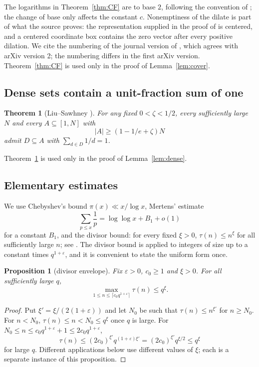 \documentclass[11pt,letterpaper]{article}
\numberwithin{equation}{section}
\theoremstyle{plain}
\newtheorem{theorem}{Theorem}
\newtheorem{proposition}{Proposition}
\theoremstyle{remark}
\begin{document}
The logarithms in Theorem~\ref{thm:CF} are to base $2$, following the convention of \cite{CFP}; the change of base only affects the constant $c$. Nonemptiness of the dilate is part of what the source proves: the representation supplied in the proof of \cite[Theorem 1.5, pp.~26--27]{CFP} is centered, and a centered coordinate box contains the zero vector after every positive dilation. We cite the numbering of the journal version of \cite{CFHMPSV}, which agrees with arXiv version 2; the numbering differs in the first arXiv version. Theorem~\ref{thm:CF} is used only in the proof of Lemma~\ref{lem:cover}.

\subsection{Dense sets contain a unit-fraction sum of one}\label{sec:LS}

\begin{theorem}[Liu--Sawhney {\cite[Theorem 1.3]{LS}}]\label{thm:LS}
For any fixed $0<\zeta<1/2$, every sufficiently large $N$ and every $A\subseteq[1,N]$ with
\[
|A|\ge(1-1/e+\zeta)N
\]
admit $D\subseteq A$ with $\sum_{d\in D}1/d=1$.
\end{theorem}

Theorem~\ref{thm:LS} is used only in the proof of Lemma~\ref{lem:dense}.

\subsection{Elementary estimates}\label{sec:elem}

We use Chebyshev's bound $\pi(x)\ll x/\log x$, Mertens' estimate
\begin{equation}\label{eq:mertens}
\sum_{p\le x}\frac1p=\log\log x+B_1+o(1)
\end{equation}
for a constant $B_1$, and the divisor bound: for every fixed $\xi>0$, $\tau(n)\le n^{\xi}$ for all sufficiently large $n$; see \cite[Theorems 7, 427 and 315]{HW}. The divisor bound is applied to integers of size up to a constant times $q^{1+\varepsilon}$, and it is convenient to state the uniform form once.

\begin{proposition}[divisor envelope]\label{prop:envelope}
Fix $\varepsilon>0$, $c_0\ge1$ and $\xi>0$. For all sufficiently large $q$,
\[
\max_{1\le n\le\lceil c_0q^{1+\varepsilon}\rceil}\tau(n)\le q^{\xi}.
\]
\end{proposition}

\begin{proof}
Put $\xi'=\xi/(2(1+\varepsilon))$ and let $N_0$ be such that $\tau(n)\le n^{\xi'}$ for $n\ge N_0$. For $n<N_0$, $\tau(n)\le n<N_0\le q^\xi$ once $q$ is large. For $N_0\le n\le c_0q^{1+\varepsilon}+1\le2c_0q^{1+\varepsilon}$,
\[
\tau(n)\le(2c_0)^{\xi'}q^{(1+\varepsilon)\xi'}=(2c_0)^{\xi'}q^{\xi/2}\le q^\xi
\]
for large $q$. Different applications below use different values of $\xi$; each is a separate instance of this proposition.
\end{proof}
\end{document}
